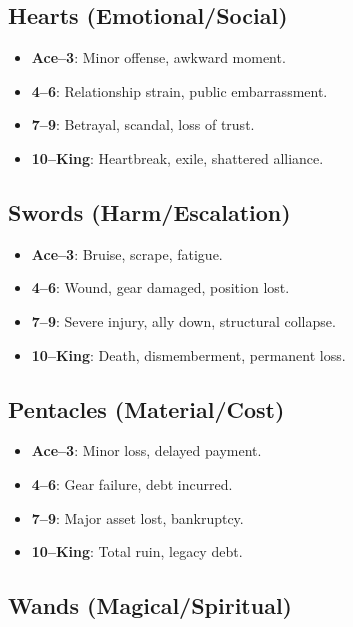 \subsection*{Hearts (Emotional/Social)}

\begin{itemize}
    \item \textbf{Ace–3}: Minor offense, awkward moment.
    \item \textbf{4–6}: Relationship strain, public embarrassment.
    \item \textbf{7–9}: Betrayal, scandal, loss of trust.
    \item \textbf{10–King}: Heartbreak, exile, shattered alliance.
\end{itemize}

\subsection*{Swords (Harm/Escalation)}

\begin{itemize}
    \item \textbf{Ace–3}: Bruise, scrape, fatigue.
    \item \textbf{4–6}: Wound, gear damaged, position lost.
    \item \textbf{7–9}: Severe injury, ally down, structural collapse.
    \item \textbf{10–King}: Death, dismemberment, permanent loss.
\end{itemize}

\subsection*{Pentacles (Material/Cost)}

\begin{itemize}
    \item \textbf{Ace–3}: Minor loss, delayed payment.
    \item \textbf{4–6}: Gear failure, debt incurred.
    \item \textbf{7–9}: Major asset lost, bankruptcy.
    \item \textbf{10–King}: Total ruin, legacy debt.
\end{itemize}

\subsection*{Wands (Magical/Spiritual)}

